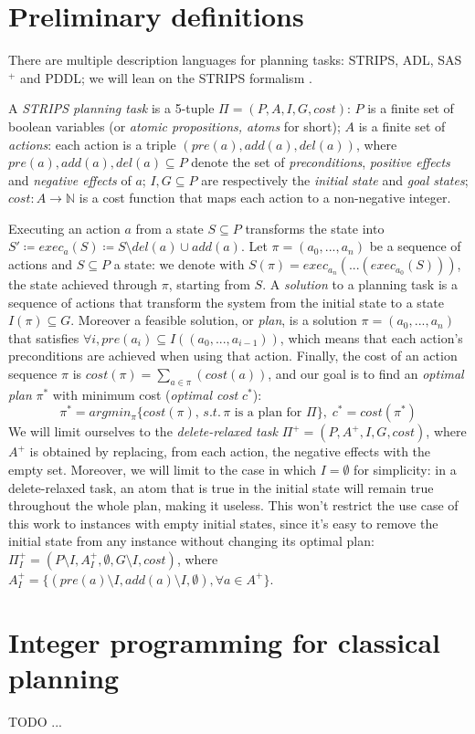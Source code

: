 \section{Preliminary definitions}
There are multiple description languages for planning tasks: STRIPS, ADL, SAS$^+$ and PDDL; we will lean on the STRIPS formalism \cite{Fikes_71}.

A \textit{STRIPS planning task} is a 5-tuple $\Pi=(P,A,I,G,cost)$: $P$ is a finite set of boolean variables (or \textit{atomic propositions, atoms} for short); $A$ is a finite set of \textit{actions}: each action is a triple $(pre(a), add(a), del(a))$, where $pre(a),add(a),del(a)\subseteq P$ denote the set of \textit{preconditions}, \textit{positive effects} and \textit{negative effects} of $a$; $I,G\subseteq P$ are respectively the \textit{initial state} and \textit{goal states}; $cost:A\to\mathbb{N}$ is a cost function that maps each action to a non-negative integer.

Executing an action $a$ from a state $S\subseteq P$ transforms the state into $S'\coloneq exec_a(S)\coloneq S\setminus del(a)\cup add(a)$.
Let $\pi=(a_0,...,a_n)$ be a sequence of actions and $S\subseteq P$ a state: we denote with $S(\pi)=exec_{a_n}(...(exec_{a_0}(S)))$, the state achieved through $\pi$, starting from $S$.
A \textit{solution} to a planning task is a sequence of actions that transform the system from the initial state to a state $I(\pi)\subseteq G$. Moreover a feasible solution, or \textit{plan}, is a solution $\pi=(a_0,...,a_n)$ that satisfies $\forall i,pre(a_i)\subseteq I((a_0,...,a_{i-1}))$, which means that each action's preconditions are achieved when using that action. Finally, the cost of an action sequence $\pi$ is $cost(\pi)=\sum_{a\in\pi}(cost(a))$, and our goal is to find an \textit{optimal plan} $\pi^*$ with minimum cost (\textit{optimal cost} $c^*$): $$\pi^*=argmin_{\pi}\{{cost(\pi)},\,s.t.\,\pi\mbox{ is a plan for }\Pi\},\;c^*=cost(\pi^*)$$
We will limit ourselves to the \textit{delete-relaxed task} $\Pi^+=(P,A^+,I,G,cost)$, where $A^+$ is obtained by replacing, from each action, the negative effects with the empty set. Moreover, we will limit to the case in which $I=\emptyset$ for simplicity: in a delete-relaxed task, an atom that is true in the initial state will remain true throughout the whole plan, making it useless. This won't restrict the use case of this work to instances with empty initial states, since it's easy to remove the initial state from any instance without changing its optimal plan: $\Pi^+_I=(P\setminus I, A^+_{I}, \emptyset, G\setminus I, cost)$, where $A^+_I=\{(pre(a)\setminus I, add(a)\setminus I, \emptyset),\forall a\in A^+\}$.

\section{Integer programming for classical planning}

TODO ...